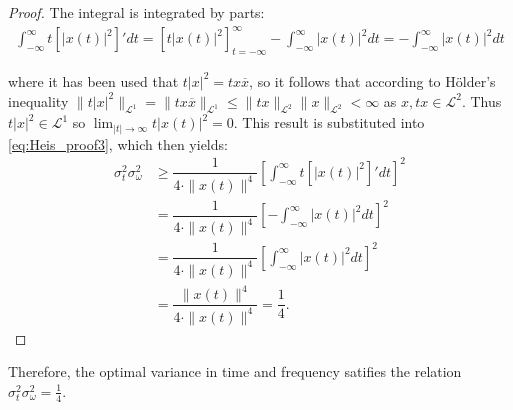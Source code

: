 \begin{proof}
The integral is integrated by parts:
\begin{align*}
\int_{-\infty}^\infty t \left[ |x(t)|^2 \right]' dt = \left[ t |x(t)|^2 \right]_{t=-\infty}^\infty - \int_{-\infty}^\infty |x(t)|^2 dt = - \int_{-\infty}^\infty |x(t)|^2 dt
\end{align*}

where it has been used that $t|x|^2 = tx\overline{x}$, so it follows that according to Hölder's inequality $\|t|x|^2\|_{\mathcal{L}^1} = \|tx\overline{x}\|_{\mathcal{L}^1} \leq \|tx\|_{\mathcal{L}^2} \|x\|_{\mathcal{L}^2} < \infty$ as $x,tx \in \mathcal{L}^2$. Thus $t|x|^2 \in \mathcal{L}^1$ so $\lim_{|t| \to \infty} t |x(t)|^2 = 0$. This result is substituted into \eqref{eq:Heis_proof3}, which then yields:
\begin{align*}
\sigma_t^2 \sigma_\omega^2 &\geq \dfrac{1}{4 \cdot \|x(t)\|^4} \left[ \int_{-\infty}^\infty t \left[ |x(t)|^2 \right]' dt \right]^2 \\
&= \dfrac{1}{4 \cdot \|x(t)\|^4} \left[ - \int_{-\infty}^\infty |x(t)|^2 dt \right]^2 \\
&= \dfrac{1}{4 \cdot \|x(t)\|^4} \left[ \int_{-\infty}^\infty |x(t)|^2 dt \right]^2 \\
&= \dfrac{\|x(t)\|^4}{4 \cdot \|x(t)\|^4} = \dfrac{1}{4}.
\end{align*}
\end{proof}

Therefore, the optimal variance in time and frequency satifies the relation $\sigma_t^2\sigma_\omega^2 = \frac{1}{4}$.